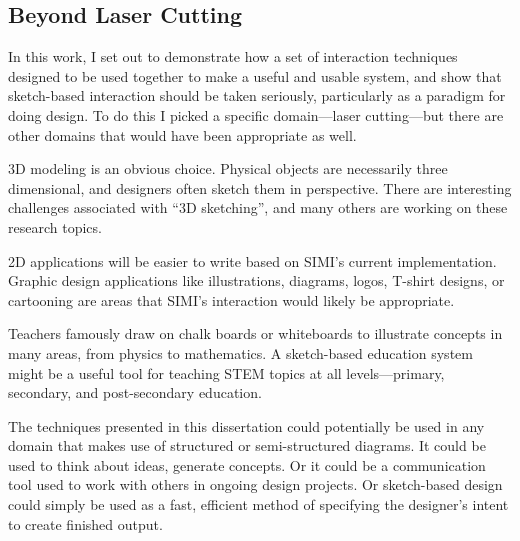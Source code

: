 \subsection{Beyond Laser Cutting}

In this work, I set out to demonstrate how a set of interaction
techniques designed to be used together to make a useful and usable
system, and show that sketch-based interaction should be taken
seriously, particularly as a paradigm for doing design. To do this I
picked a specific domain---laser cutting---but there are other domains
that would have been appropriate as well. 

3D modeling is an obvious choice. Physical objects are necessarily
three dimensional, and designers often sketch them in
perspective. There are interesting challenges associated with ``3D
sketching'', and many others are working on these research topics.

2D applications will be easier to write based on SIMI's current
implementation. Graphic design applications like illustrations,
diagrams, logos, T-shirt designs, or cartooning are areas that SIMI's
interaction would likely be appropriate.

Teachers famously draw on chalk boards or whiteboards to illustrate
concepts in many areas, from physics to mathematics. A sketch-based
education system might be a useful tool for teaching STEM topics at
all levels---primary, secondary, and post-secondary education.

The techniques presented in this dissertation could potentially be used
in any domain that makes use of structured or semi-structured
diagrams. It could be used to think about ideas, generate concepts. Or
it could be a communication tool used to work with others in ongoing
design projects. Or sketch-based design could simply be used as a
fast, efficient method of specifying the designer's intent to create
finished output.


